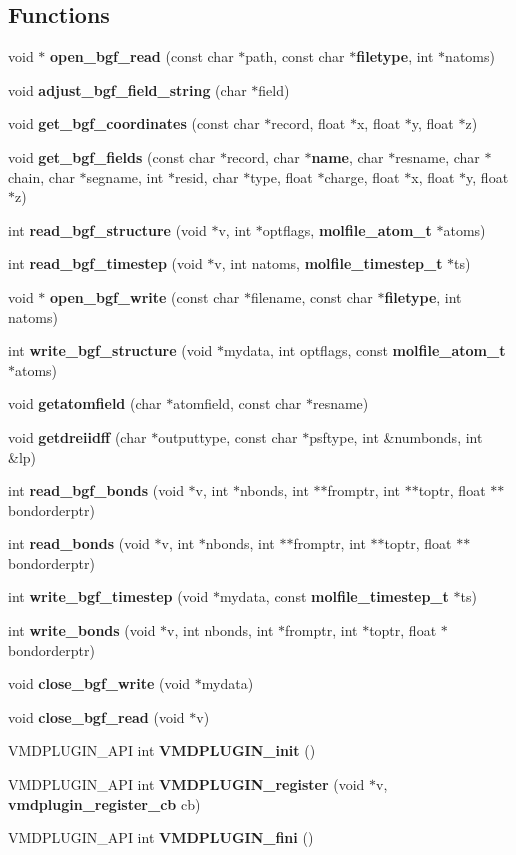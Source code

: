 \subsection*{Functions}
\begin{CompactItemize}
\item 
void $\ast$ {\bf open\_\-bgf\_\-read} (const char $\ast$path, const char $\ast${\bf filetype}, int $\ast$natoms)
\item 
void {\bf adjust\_\-bgf\_\-field\_\-string} (char $\ast$field)
\item 
void {\bf get\_\-bgf\_\-coordinates} (const char $\ast$record, float $\ast$x, float $\ast$y, float $\ast$z)
\item 
void {\bf get\_\-bgf\_\-fields} (const char $\ast$record, char $\ast${\bf name}, char $\ast$resname, char $\ast$chain, char $\ast$segname, int $\ast$resid, char $\ast$type, float $\ast$charge, float $\ast$x, float $\ast$y, float $\ast$z)
\item 
int {\bf read\_\-bgf\_\-structure} (void $\ast$v, int $\ast$optflags, {\bf molfile\_\-atom\_\-t} $\ast$atoms)
\item 
int {\bf read\_\-bgf\_\-timestep} (void $\ast$v, int natoms, {\bf molfile\_\-timestep\_\-t} $\ast$ts)
\item 
void $\ast$ {\bf open\_\-bgf\_\-write} (const char $\ast$filename, const char $\ast${\bf filetype}, int natoms)
\item 
int {\bf write\_\-bgf\_\-structure} (void $\ast$mydata, int optflags, const {\bf molfile\_\-atom\_\-t} $\ast$atoms)
\item 
void {\bf getatomfield} (char $\ast$atomfield, const char $\ast$resname)
\item 
void {\bf getdreiidff} (char $\ast$outputtype, const char $\ast$psftype, int \&numbonds, int \&lp)
\item 
int {\bf read\_\-bgf\_\-bonds} (void $\ast$v, int $\ast$nbonds, int $\ast$$\ast$fromptr, int $\ast$$\ast$toptr, float $\ast$$\ast$bondorderptr)
\item 
int {\bf read\_\-bonds} (void $\ast$v, int $\ast$nbonds, int $\ast$$\ast$fromptr, int $\ast$$\ast$toptr, float $\ast$$\ast$bondorderptr)
\item 
int {\bf write\_\-bgf\_\-timestep} (void $\ast$mydata, const {\bf molfile\_\-timestep\_\-t} $\ast$ts)
\item 
int {\bf write\_\-bonds} (void $\ast$v, int nbonds, int $\ast$fromptr, int $\ast$toptr, float $\ast$bondorderptr)
\item 
void {\bf close\_\-bgf\_\-write} (void $\ast$mydata)
\item 
void {\bf close\_\-bgf\_\-read} (void $\ast$v)
\item 
VMDPLUGIN\_\-API int {\bf VMDPLUGIN\_\-init} ()
\item 
VMDPLUGIN\_\-API int {\bf VMDPLUGIN\_\-register} (void $\ast$v, {\bf vmdplugin\_\-register\_\-cb} cb)
\item 
VMDPLUGIN\_\-API int {\bf VMDPLUGIN\_\-fini} ()
\end{CompactItemize}
